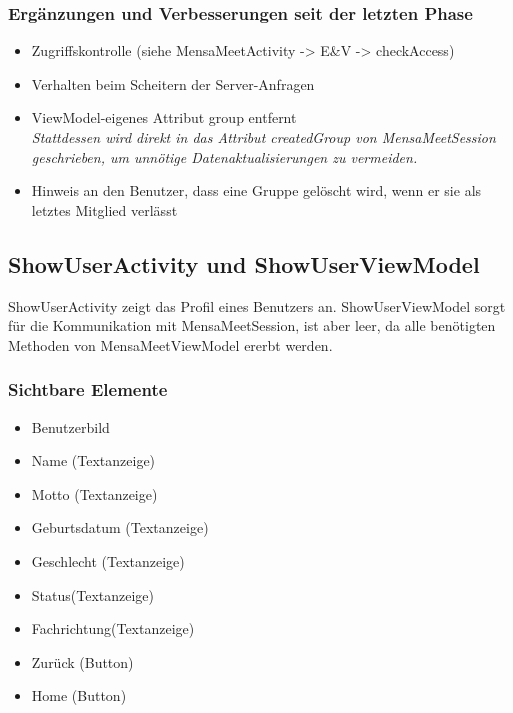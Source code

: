 \documentclass[a4paper]{scrreprt}
\begin{document}
\subsubsection{Ergänzungen und Verbesserungen seit der letzten Phase}
\begin{itemize}
\item Zugriffskontrolle (siehe MensaMeetActivity -> E\&V -> checkAccess)
\item Verhalten beim Scheitern der Server-Anfragen
\item ViewModel-eigenes Attribut group entfernt\\
\textit{Stattdessen wird direkt in das Attribut createdGroup von MensaMeetSession geschrieben, um unnötige Datenaktualisierungen zu vermeiden.}
\item Hinweis an den Benutzer, dass eine Gruppe gelöscht wird, wenn er sie als letztes Mitglied verlässt
\end{itemize}


\subsection{ShowUserActivity und ShowUserViewModel}
ShowUserActivity zeigt das Profil eines Benutzers an. ShowUserViewModel sorgt für die Kommunikation mit MensaMeetSession, ist aber leer, da alle benötigten Methoden von MensaMeetViewModel ererbt werden.


\subsubsection{Sichtbare Elemente}
\begin{itemize}
\item Benutzerbild
\item Name (Textanzeige)
\item Motto (Textanzeige)
\item Geburtsdatum (Textanzeige)
\item Geschlecht (Textanzeige)
\item Status(Textanzeige)
\item Fachrichtung(Textanzeige)
\item Zurück (Button)
\item Home (Button)
\end{itemize}
\end{document}
